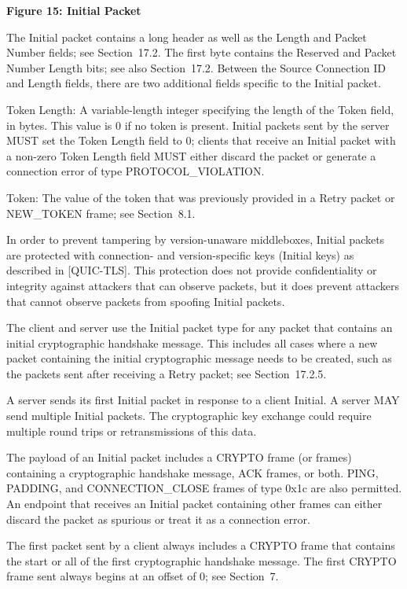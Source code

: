 \documentclass{article}
\begin{document}
\begin{center}
\textbf{Figure 15: Initial Packet}
\end{center}

The Initial packet contains a long header as well as the Length and Packet Number fields; see Section~17.2.  The first byte contains the Reserved and Packet Number Length bits; see also Section~17.2. Between the Source Connection ID and Length fields, there are two additional fields specific to the Initial packet.

Token Length:  A variable-length integer specifying the length of the Token field, in bytes.  This value is 0 if no token is present. Initial packets sent by the server MUST set the Token Length field to 0; clients that receive an Initial packet with a non-zero Token Length field MUST either discard the packet or generate a connection error of type PROTOCOL\_VIOLATION.

Token:  The value of the token that was previously provided in a Retry packet or NEW\_TOKEN frame; see Section~8.1.

In order to prevent tampering by version-unaware middleboxes, Initial packets are protected with connection- and version-specific keys (Initial keys) as described in [QUIC-TLS].  This protection does not provide confidentiality or integrity against attackers that can observe packets, but it does prevent attackers that cannot observe packets from spoofing Initial packets.

The client and server use the Initial packet type for any packet that contains an initial cryptographic handshake message.  This includes all cases where a new packet containing the initial cryptographic message needs to be created, such as the packets sent after receiving a Retry packet; see Section~17.2.5.

A server sends its first Initial packet in response to a client Initial.  A server MAY send multiple Initial packets.  The cryptographic key exchange could require multiple round trips or retransmissions of this data.

The payload of an Initial packet includes a CRYPTO frame (or frames) containing a cryptographic handshake message, ACK frames, or both. PING, PADDING, and CONNECTION\_CLOSE frames of type 0x1c are also permitted.  An endpoint that receives an Initial packet containing other frames can either discard the packet as spurious or treat it as a connection error.

The first packet sent by a client always includes a CRYPTO frame that contains the start or all of the first cryptographic handshake message.  The first CRYPTO frame sent always begins at an offset of 0; see Section~7.
\end{document}
